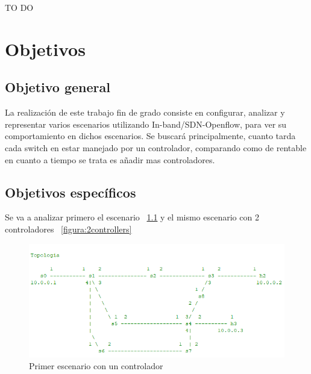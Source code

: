 \documentclass[a4paper, 12pt]{book}
\begin{document}
	TO DO
	
	
	
	\cleardoublepage %
	\chapter{Objetivos} %
	\label{chap:objetivos} %
	
	\section{Objetivo general} %
	\label{sec:objetivo-general} %
	
	La realización de este trabajo fin de grado consiste en configurar, analizar y representar varios escenarios utilizando In-band/SDN-Openflow, para ver su comportamiento en dichos escenarios. Se buscará principalmente, cuanto tarda cada switch en estar manejado por un controlador, comparando como de rentable en cuanto a tiempo se trata es añadir mas controladores.
	
	\section{Objetivos específicos}
	\label{sec:objetivos-especificos}
	
 	Se va a analizar primero el escenario ~\ref{figura:bucle4} y el mismo escenario con 2 controladores ~\ref{figura:2controllers}
	
	\begin{figure}
		\centering
		\includegraphics[width=16cm, keepaspectratio]{img/bucle4}
		\caption{Primer escenario con un controlador}
		\label{figura:bucle4}
	\end{figure}
	
\end{document}

